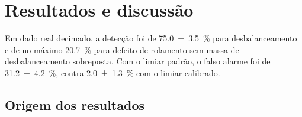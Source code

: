 
\makeatletter
{}
\makeatother

\providecommand{\kxfig}[1]{../../experiments/figures/output/#1}

\chapter{Resultados e discussão}
\label{cap:resultados}

Em dado real decimado, a detecção foi de \SI{75,0 \pm 3,5}{\percent} para desbalanceamento
e de no máximo \SI{20,7}{\percent} para defeito de rolamento sem massa de desbalanceamento
sobreposta. Com o limiar padrão, o falso alarme foi de \SI{31,2 \pm 4,2}{\percent}, contra
\SI{2,0 \pm 1,3}{\percent} com o limiar calibrado.

\section{Origem dos resultados}
\label{sec:proc}

